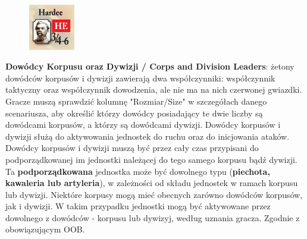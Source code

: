 \documentclass[10pt,twoside,a4paper,table]{article}
\begin{document}
\begin{multicols*}{2}
	\begin{figure}
		\includegraphics[width=2cm, height=2cm]{leader_3.png} 
	\end{figure}
	\textbf{Dowódcy Korpusu oraz Dywizji / Corps and Division Leaders}: żetony dowódców korpusów i dywizji zawierają dwa współczynniki: współczynnik taktyczny oraz współczynnik dowodzenia, ale nie ma na nich czerwonej gwiazdki. Gracze muszą sprawdzić kolumnę "Rozmiar/Size" w szczegółach danego scenariusza, aby określić którzy dowódcy posiadający te dwie liczby są dowódcami korpusów, a którzy są dowódcami dywizji. Dowódcy korpusów i dywizji służą do aktywowania jednostek do ruchu oraz do inicjowania ataków. Dowódcy korpusów i dywizji muszą być przez cały czas przypisani do podporządkowanej im jednostki należącej do tego samego korpusu bądź dywizji. Ta \textbf{podporządkowana} jednostka może być dowolnego typu (\textbf{piechota, kawaleria lub artyleria}), w zależności od składu jednostek w ramach korpusu lub dywizji. Niektóre korpusy mogą mieć obecnych zarówno dowódców korpusów, jak i dywizji. W takim przypadku jednostki mogą być aktywowane przez dowolnego z dowódców - korpusu lub dywizyj, według uznania gracza. Zgodnie z obowiązującym OOB.\par

\end{multicols*}
\end{document}
